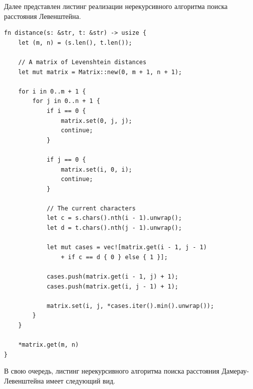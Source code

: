 \documentclass[oneside, a4paper, 12pt]{article}
\begin{document}
Далее представлен листинг реализации нерекурсивного алгоритма
поиска расстояния Левенштейна.

\begin{lstlisting}[caption=
    Нерекурсивная реализация алгоритма поиска расстояния
    Левенштейна.
]
fn distance(s: &str, t: &str) -> usize {
    let (m, n) = (s.len(), t.len());

    // A matrix of Levenshtein distances
    let mut matrix = Matrix::new(0, m + 1, n + 1);

    for i in 0..m + 1 {
        for j in 0..n + 1 {
            if i == 0 {
                matrix.set(0, j, j);
                continue;
            }

            if j == 0 {
                matrix.set(i, 0, i);
                continue;
            }

            // The current characters
            let c = s.chars().nth(i - 1).unwrap();
            let d = t.chars().nth(j - 1).unwrap();

            let mut cases = vec![matrix.get(i - 1, j - 1)
                + if c == d { 0 } else { 1 }];

            cases.push(matrix.get(i - 1, j) + 1);
            cases.push(matrix.get(i, j - 1) + 1);

            matrix.set(i, j, *cases.iter().min().unwrap());
        }
    }

    *matrix.get(m, n)
}
\end{lstlisting}

В свою очередь, листинг нерекурсивного алгоритма поиска расстояния
Дамерау-Левенштейна имеет следующий вид.
\end{document}
